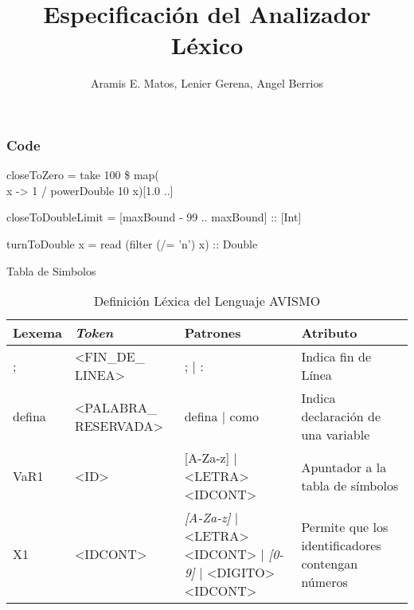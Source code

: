 \documentclass[14pt, aspectratio=169]{beamer}
\title{Especificación del Analizador Léxico}
\author{Aramis E. Matos, Lenier Gerena, Angel Berrios}
\begin{document}
\maketitle

\begin{frame}[fragile=singleslide]
    \frametitle{Code}
    \small
closeToZero = take 100 \$ map(\\x -> 1 / powerDouble 10 x)[1.0 ..]

closeToDoubleLimit = [maxBound - 99 .. maxBound] :: [Int]

turnToDouble x = read (filter (/= 'n') x) :: Double

\end{frame}

\begin{frame}{Tabla de Simbolos}
    
\begin{table}[ht]
    \footnotesize
    \begin{tabularx}{\linewidth}{|X|X|X|X|}
        \hline
        Lexema & \textit{Token}        & Patrones                                                              & Atributo                                          \\\hline
        ;      & <FIN\_DE\_ LINEA>     & ; | :                                                                 & Indica fin de Línea                               \\\hline
        defina & <PALABRA\_ RESERVADA> & defina | como                                                         & Indica declaración de una variable                \\\hline
        VaR1   & <ID>                  & [A-Za-z] | <LETRA> <IDCONT>                                           & Apuntador a la tabla de símbolos                  \\\hline
        X1     & <IDCONT>              & \textit{[A-Za-z]} | <LETRA> <IDCONT> | \textit{[0-9]} | <DIGITO> <IDCONT> & Permite que los identificadores contengan números \\\hline
    \end{tabularx}
    \label{table: lexTable1}
    \caption{Definición Léxica del Lenguaje AVISMO}
\end{table}
\end{frame}
\end{document}

